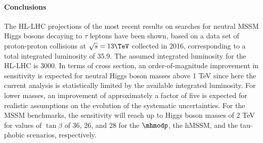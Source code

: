 \paragraph{Conclusions}
\label{sec:conclusions}
%
The HL-LHC projections of the most recent results on searches for neutral 
MSSM Higgs bosons decaying to $\tau$ leptons have been shown,
based on a data set of proton-proton collisions at $\sqrt{s}=13\TeV$
collected in 2016, 
corresponding to a total integrated luminosity of 35.9\fbinv.
The assumed integrated luminosity for the HL-LHC is 3000\fbinv.
In terms of cross section, 
an order-of-magnitude improvement in sensitivity
is expected for neutral Higgs boson masses above 1 TeV 
since here the current analysis is statistically limited by the 
available integrated luminosity. For lower masses, an improvement of 
approximately a factor of five is expected for realistic
assumptions on the evolution of the systematic uncertainties.
For the MSSM benchmarks,
the sensitivity will reach up to Higgs boson masses
of 2 TeV for values of $\tan \beta$ of 36, 26, and 28  
for the $\mhmodp$, the hMSSM, and the tau-phobic scenarios,
respectively.